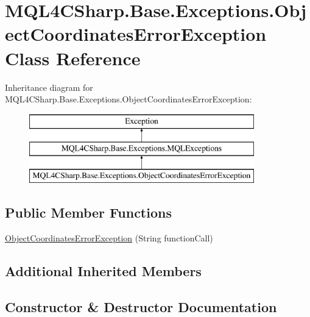 \hypertarget{class_m_q_l4_c_sharp_1_1_base_1_1_exceptions_1_1_object_coordinates_error_exception}{}\section{M\+Q\+L4\+C\+Sharp.\+Base.\+Exceptions.\+Object\+Coordinates\+Error\+Exception Class Reference}
\label{class_m_q_l4_c_sharp_1_1_base_1_1_exceptions_1_1_object_coordinates_error_exception}
Inheritance diagram for M\+Q\+L4\+C\+Sharp.\+Base.\+Exceptions.\+Object\+Coordinates\+Error\+Exception\+:\begin{figure}[H]
\begin{center}
\leavevmode
\includegraphics[height=3.000000cm]{class_m_q_l4_c_sharp_1_1_base_1_1_exceptions_1_1_object_coordinates_error_exception}
\end{center}
\end{figure}
\subsection*{Public Member Functions}
\begin{DoxyCompactItemize}
\item 
\hyperlink{class_m_q_l4_c_sharp_1_1_base_1_1_exceptions_1_1_object_coordinates_error_exception_a563553ce5bb3a7d7b74929782f023ce5}{Object\+Coordinates\+Error\+Exception} (String function\+Call)
\end{DoxyCompactItemize}
\subsection*{Additional Inherited Members}


\subsection{Constructor \& Destructor Documentation}
